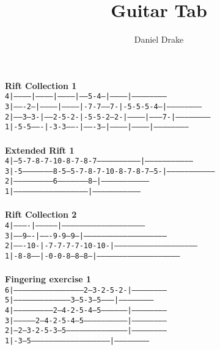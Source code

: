 \documentclass[12pt]{extarticle}
\title{Guitar Tab}
\author{Daniel Drake}
\def\code#1{\texttt{#1}}
\begin{document}
\maketitle
\noindent
\textbf{Rift Collection 1} \\
\code{4|-----------|-----------|-----------|-----5-4---|-----------|------------------------}\\
\code{3|-------2---|-----------|-----------|-7-7-----7-|-5-5-5-4---|------------------------}\\
\code{2|-----3---3-|-----2-5-2-|-5-5-2---2-|-----------|---------7-|------------------------}\\
\code{1|-5-5-------|-3-3-------|-------3---|-----------|-----------|------------------------}\\\\
\textbf{Extended Rift 1} \\
\code{4|---5-7-8-7-10-8-7-8-7------------------------------|---------------------------------}\\
\code{3|-5--------------------8-5---5-7-8-7-10-8-7-8-7---5-|---------------------------------}\\
\code{2|--------------------------6--------------------8---|--------------------------------}\\
\code{1|---------------------------------------------------|--------------------------------}\\\\
\textbf{Rift Collection 2} \\
\code{4|----------|---------------|---------------------------------------------------------}\\
\code{3|-----9----|-------9-9--9--|---------------------------------------------------------}\\
\code{2|-------10-|-7-7-7-7-10-10-|---------------------------------------------------------}\\
\code{1|-8-8------|-0-0-8---8--8--|---------------------------------------------------------}\\\\
\textbf{Fingering exercise 1}\\
\code{6|-----------------------------------------------2---3-2-5-2-|------------------------}\\
\code{5|---------------------------------------3---5-3---5---------|------------------------}\\
\code{4|---------------------------2---4-2-5-4---5-----------------|------------------------}\\
\code{3|---------------2---4-2-5-4---5-----------------------------|------------------------}\\
\code{2|---2---3-2-5-3---5-----------------------------------------|------------------------}\\
\code{1|-3---5-----------------------------------------------------|------------------------}\\\\
\end{document}
